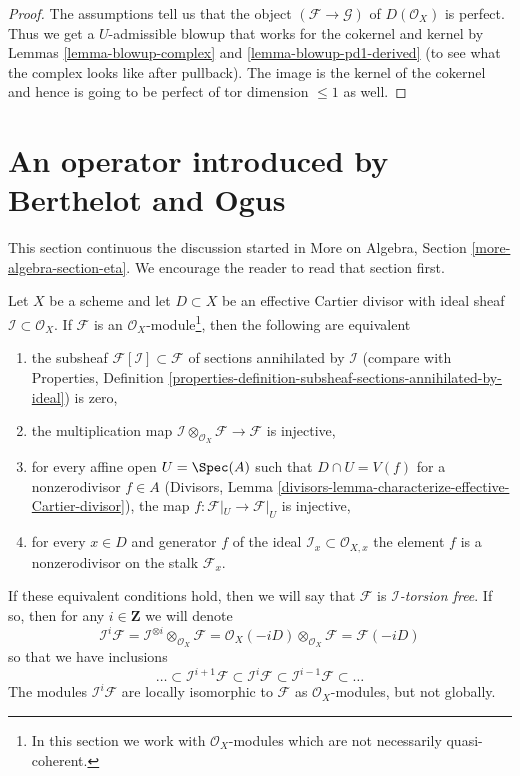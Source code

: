 \begin{proof}
The assumptions tell us that the object $(\mathcal{F} \to \mathcal{G})$
of $D(\mathcal{O}_X)$ is perfect. Thus we get a $U$-admissible blowup that
works for the cokernel and kernel by Lemmas \ref{lemma-blowup-complex}
and \ref{lemma-blowup-pd1-derived} (to see what the complex looks
like after pullback). The image is the kernel of the cokernel
and hence is going to be perfect of tor dimension $\leq 1$ as well.
\end{proof}








\section{An operator introduced by Berthelot and Ogus}
\label{section-eta}

\noindent
This section continuous the discussion started in
More on Algebra, Section \ref{more-algebra-section-eta}.
We encourage the reader to read that section first.

\medskip\noindent
Let $X$ be a scheme and let $D \subset X$ be an effective Cartier divisor
with ideal sheaf $\mathcal{I} \subset \mathcal{O}_X$. If $\mathcal{F}$
is an $\mathcal{O}_X$-module\footnote{In this section we work with
$\mathcal{O}_X$-modules which are not necessarily quasi-coherent.},
then the following are equivalent
\begin{enumerate}
\item the subsheaf $\mathcal{F}[\mathcal{I}] \subset \mathcal{F}$
of sections annihilated by $\mathcal{I}$ (compare with Properties, Definition
\ref{properties-definition-subsheaf-sections-annihilated-by-ideal}) is zero,
\item the multiplication map
$\mathcal{I} \otimes_{\mathcal{O}_X} \mathcal{F} \to \mathcal{F}$
is injective,
\item for every affine open $U = \Spec(A)$ such that $D \cap U = V(f)$
for a nonzerodivisor $f \in A$
(Divisors, Lemma \ref{divisors-lemma-characterize-effective-Cartier-divisor}),
the map $f : \mathcal{F}|_U \to \mathcal{F}|_U$ is injective,
\item for every $x \in D$ and generator $f$ of the ideal
$\mathcal{I}_x \subset \mathcal{O}_{X, x}$ the element $f$
is a nonzerodivisor on the stalk $\mathcal{F}_x$.
\end{enumerate}
If these equivalent conditions hold, then
we will say that $\mathcal{F}$ is {\it $\mathcal{I}$-torsion free}.
If so, then for any $i \in \mathbf{Z}$ we will denote
$$
\mathcal{I}^i\mathcal{F} =
\mathcal{I}^{\otimes i} \otimes_{\mathcal{O}_X} \mathcal{F} =
\mathcal{O}_X(-iD) \otimes_{\mathcal{O}_X} \mathcal{F} =
\mathcal{F}(-iD)
$$
so that we have inclusions
$$
\ldots \subset
\mathcal{I}^{i + 1}\mathcal{F} \subset
\mathcal{I}^i\mathcal{F} \subset
\mathcal{I}^{i - 1}\mathcal{F} \subset \ldots
$$
The modules $\mathcal{I}^i\mathcal{F}$ are locally isomorphic to
$\mathcal{F}$ as $\mathcal{O}_X$-modules, but not globally.


